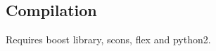 \subsection*{Compilation}

Requires {\ttfamily boost} library, {\ttfamily scons}, {\ttfamily flex} and {\ttfamily python2}.


 